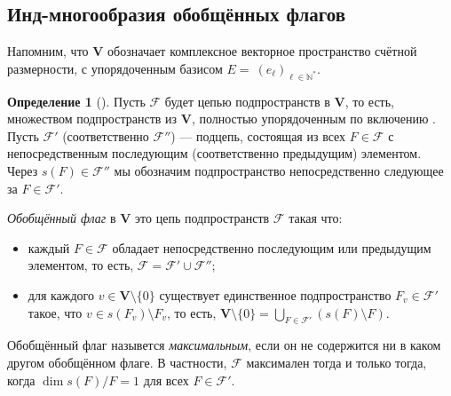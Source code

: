 \documentclass{amsart}
\theoremstyle{definition}
\newtheorem{definition}{Определение}
\newcommand{\NN}{\mathbb{N}^*}
\begin{document}
\subsection{Инд-многообразия обобщённых флагов}

\label{S2.3}

Напомним, что $\mathbf{V}$ обозначает комплексное векторное пространство счётной размерности,
с упорядоченным базисом $E= \ (e_\ell)_{\ell\in\NN}$.

\begin{definition}[\cite{Dimitrov-Penkov}]
Пусть $\mathcal{F}$ будет цепью подпространств в $\mathbf{V}$, то есть, множеством подпространств из $\mathbf{V}$, полностью упорядоченным по  включению . Пусть $\mathcal{F}'$ (соответственно $\mathcal{F}''$) --- подцепь, состоящая из всех $F\in\mathcal{F}$ с непосредственным последующим (соответственно предыдущим) элементом.
Через $s(F)\in\mathcal{F}''$  мы обозначим подпространство непосредственно следующее за  $F\in\mathcal{F}'$.

{\em Обобщённый флаг} в $\mathbf{V}$ это цепь подпространств $\mathcal{F}$ такая что:
\begin{itemize}
\item[\rm (i)] каждый $F\in\mathcal{F}$ обладает непосредственно последующим или предыдущим элементом,
то есть, $\mathcal{F}=\mathcal{F}'\cup\mathcal{F}''$;
\item[\rm (ii)] для каждого $v\in\mathbf{V}\setminus\{0\}$ существует единственное подпространство $F_v\in\mathcal{F}'$ такое, что $v\in s(F_v)\setminus F_v$, то есть,
$\mathbf{V}\setminus\{0\}=\bigcup_{F\in\mathcal{F}'}(s(F)\setminus F)$.
\end{itemize}

Обобщённый флаг назывется  {\em максимальным}, если он не содержится ни в каком другом обобщённом  флаге.
В частности, $\mathcal{F}$ максимален тогда и только тогда, когда $\dim s(F)/F=1$ для всех $F\in\mathcal{F}'$.
\end{definition}
\end{document}
